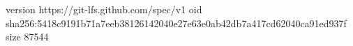 version https://git-lfs.github.com/spec/v1
oid sha256:5418c9191b71a7eeb38126142040e27e63e0ab42db7a417cd62040ca91ed937f
size 87544
